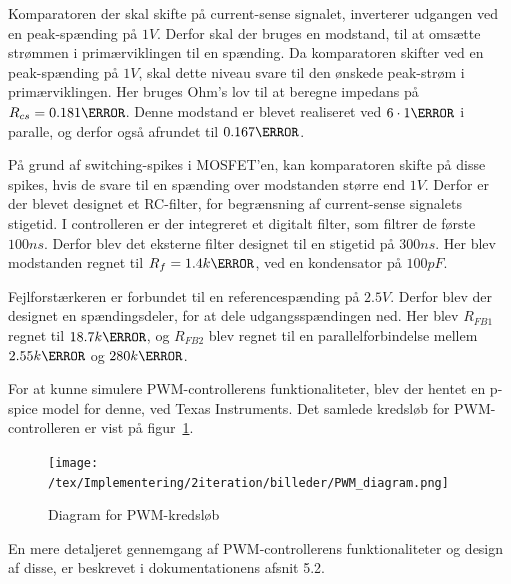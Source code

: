 Komparatoren der skal skifte på current-sense signalet, inverterer udgangen ved en peak-spænding på $1V$. Derfor skal der bruges en modstand, til at omsætte strømmen i primærviklingen til en spænding. Da komparatoren skifter ved en peak-spænding på $1V$, skal dette niveau svare til den ønskede peak-strøm i primærviklingen. Her bruges Ohm's lov til at beregne impedans på $R_{cs} = 0.181\ohm$. Denne modstand er blevet realiseret ved $6\cdot 1\ohm$ i paralle, og derfor også afrundet til $0.167\ohm$. 

På grund af switching-spikes i MOSFET'en, kan komparatoren skifte på disse spikes, hvis de svare til en spænding over modstanden større end $1V$. Derfor er der blevet designet et RC-filter, for begrænsning af current-sense signalets stigetid. I controlleren er der integreret et digitalt filter, som filtrer de første $100ns$. Derfor blev det eksterne filter designet til en stigetid på $300ns$. Her blev modstanden regnet til $R_f = 1.4k\ohm$, ved en kondensator på $100pF$.

Fejlforstærkeren er forbundet til en referencespænding på $2.5V$. Derfor blev der designet en spændingsdeler, for at dele udgangsspændingen ned. Her blev $R_{FB1}$ regnet til $18.7k\ohm$, og $R_{FB2}$ blev regnet til en parallelforbindelse mellem $2.55k\ohm$ og $280k\ohm$. 


For at kunne simulere PWM-controllerens funktionaliteter, blev der hentet en p-spice model for denne, ved Texas Instruments\cite{ucc1801-pspice}. Det samlede kredsløb for PWM-controlleren er vist på figur~\ref{fig:PWM_sim_diagram}.

\begin{figure}[H]
	\centering
	\texttt{[image: /tex/Implementering/2iteration/billeder/PWM\_diagram.png]}
	\caption{Diagram for PWM-kredsløb}
	\label{fig:PWM_sim_diagram}
\end{figure} 

En mere detaljeret gennemgang af PWM-controllerens funktionaliteter og design af disse, er beskrevet i dokumentationens afsnit 5.2.

